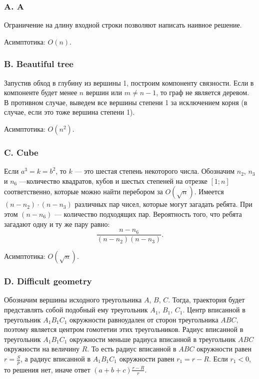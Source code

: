 \subsubsection*{A. A}


Ограничение на длину входной строки позволяют написать наивное решение.

Асимптотика: $O(n)$.

\subsubsection*{B. Beautiful tree}


Запустив обход в глубину из вершины 1, построим компоненту связности. Если в компоненте будет менее $n$ вершин или $m \neq n - 1$, то граф не является деревом. В противном случае, выведем все вершины степени 1 за исключением корня (в случае, если это тоже вершина степени 1).

Асимптотика: $O(n^2)$.

\subsubsection*{C. Cube}


Если $a^3 = k = b^2$, то $k$ --- это шестая степень некоторого числа. Обозначим $n_2$, $n_3$ и $n_6$ ---количество квадратов, кубов и шестых степеней на отрезке $[1; n]$ соответственно, которые можно найти перебором за $O(\sqrt{n})$. Имеется $(n - n_2) \cdot (n - n_3)$ различных пар чисел, которые могут загадать ребята. При этом  $(n - n_6)$ --- количество подходящих пар. Вероятность того, что ребята загадают одну и ту же пару равно: $$\frac{n-n_6}{(n - n_2)(n - n_3)}.$$

Асимптотика: $O(\sqrt{n})$.


\subsubsection*{D. Difficult geometry}


Обозначим вершины исходного треугольника $A$, $B$, $C$. Тогда, траектория будет представлять собой подобный ему треугольник $A_1$, $B_1$, $C_1$. Центр вписанной в треугольник $A_1B_1C_1$ окружности равноудален от сторон треугольника $ABC$, поэтому является центром гомотетии этих треугольников. Радиус вписанной в треугольник $A_1B_1C_1$ окружности меньше радиуса вписанной в треугольник $ABC$ окружности на величину $R$. То есть радиус вписанной в $ABC$ окружности равен $r = \frac{S}{p}$, а радиус вписанной в $A_1B_1C_1$ окружности равен $r_1 = r - R$. Если $r_1 < 0$, то решения нет, иначе ответ $(a + b + c) \frac{r - R}{r}$.

